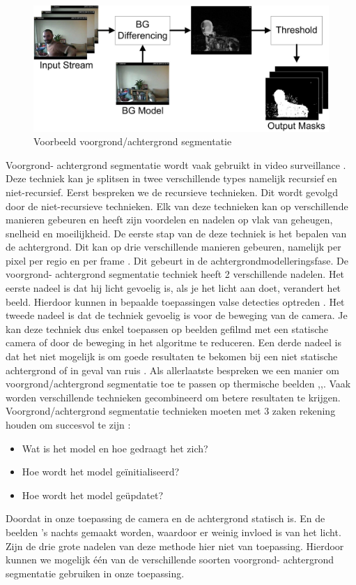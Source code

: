\begin{figure}[hbp]
	\includegraphics[scale=0.65]{BackgroundSegmentation}
	\caption{Voorbeeld voorgrond/achtergrond segmentatie}
	\label{imgVAS}
\end{figure}

Voorgrond- achtergrond segmentatie wordt vaak gebruikt in video surveillance \cite{bibBET3}. Deze techniek kan je splitsen in twee verschillende types namelijk recursief en niet-recursief. Eerst bespreken we de recursieve technieken. Dit wordt gevolgd door de niet-recursieve technieken. Elk van deze technieken kan op verschillende manieren gebeuren en heeft zijn voordelen en nadelen op vlak van geheugen, snelheid en moeilijkheid. De eerste stap van de deze techniek is het bepalen van de achtergrond. Dit kan op drie verschillende manieren gebeuren, namelijk per pixel per regio en per frame \cite{bibBET4}.  Dit gebeurt in de achtergrondmodelleringsfase. De voorgrond- achtergrond segmentatie techniek heeft 2 verschillende nadelen. Het eerste nadeel is dat hij licht gevoelig is, als je het licht aan doet, verandert het beeld. Hierdoor kunnen in bepaalde toepassingen valse detecties optreden  \cite{bibBET4}. Het tweede nadeel is dat de techniek gevoelig is voor de beweging van de camera. Je kan deze techniek dus enkel toepassen op beelden gefilmd met een statische camera \cite{bibBET7} of door de beweging in het algoritme te reduceren. Een derde nadeel is dat het niet mogelijk is om goede resultaten te bekomen bij een niet statische achtergrond of in geval van ruis \cite{bibBET9}. Als allerlaatste bespreken we een manier om voorgrond/achtergrond segmentatie toe te passen op thermische beelden \cite{bibBET5},\cite{bibBEt},\cite{bibBET2}. Vaak worden verschillende technieken gecombineerd om betere resultaten te krijgen.\\
Voorgrond/achtergrond segmentatie technieken moeten met 3 zaken rekening houden om succesvol te zijn \cite{bibBET8}:
\begin{itemize}
	\item Wat is het model en hoe gedraagt het zich?
	\item Hoe wordt het model ge\"initialiseerd?
	\item Hoe wordt het model ge\"updatet?
\end{itemize}
Doordat in onze toepassing de camera en de achtergrond statisch is. En de beelden 's nachts gemaakt worden, waardoor er weinig invloed is van het licht. Zijn de drie grote nadelen van deze methode hier niet van toepassing. Hierdoor kunnen we mogelijk \'e\'en van de verschillende soorten voorgrond- achtergrond segmentatie gebruiken in onze toepassing.
 
